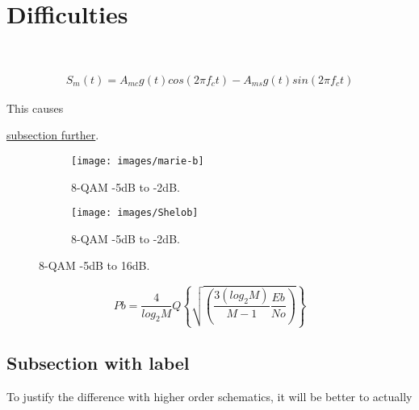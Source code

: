 \documentclass[12pt]{article}
\numberwithin{equation}{section} %
\numberwithin{figure}{section} %
\numberwithin{table}{section} %
\begin{document}
\section{Difficulties}
	\cite[p.~278]{GOD} \\ 
	\cite{michelson}
	
	\begin{align}
		S_{m}(t) = A_{mc}g(t)cos(2\pi f_{c}t) - A_{ms}g(t)sin(2\pi f_{c}t)
	\end{align}
	
	\cite{fundcomm} This causes 

	
	\hyperref[pros_cons]{subsection further}.
	
	\begin{figure}[H]
		\begin{subfigure}[b]{0.52\textwidth}
			\centering
			\texttt{[image: images/marie-b]}
			\caption*{8-QAM -5dB to -2dB.}
			\label{fig:Xana}
		\end{subfigure}
		\begin{subfigure}[b]{0.52\textwidth}
			\centering
			\texttt{[image: images/Shelob]}
			\caption*{8-QAM -5dB to -2dB.}
			\label{fig:Shelob}
		\end{subfigure}
		\caption{8-QAM -5dB to 16dB.}
		\label{fig:My laptop}
	\end{figure}
	
	\begin{equation}
		Pb = \frac{4}{log_{2}M}Q\left\lbrace \sqrt{ \left( \dfrac{3(log_{2}M)}{M-1}\frac{Eb}{No}\right)}\right\rbrace
	\end{equation}

	\subsection{Subsection with label} \label{pros_cons}
		To justify the difference with higher order schematics, it will be better to actually 	
	
\end{document}
